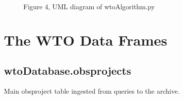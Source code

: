 \documentclass[a4paper,10pt,english]{sphinxmanual}
\begin{document}
\begin{figure}[htbp]
\centering
\capstart

\caption{Figure 4, UML diagram of wtoAlgorithm.py}\end{figure}


\chapter{The WTO Data Frames}
\label{wtodata::doc}\label{wtodata:the-wto-data-frames}

\section{wtoDatabase.obsprojects}
\label{wtodata:wtodatabase-obsprojects}
Main obsproject table ingested from queries to the archive.
\end{document}
